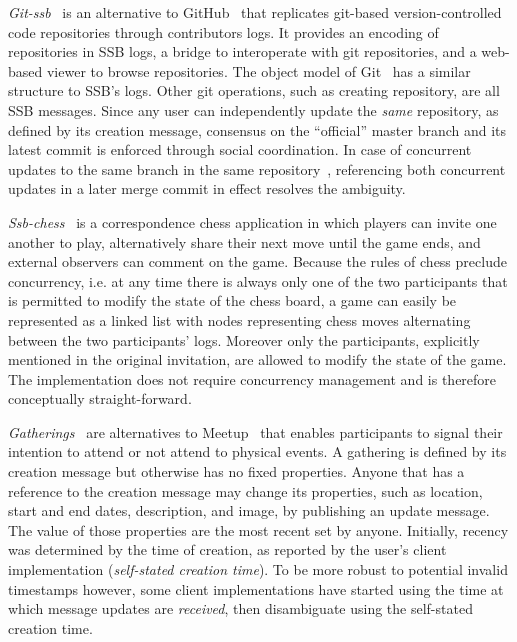\documentclass[9pt,sigconf]{acmart}
\begin{document}
\textit{Git-ssb}~\cite{git-ssb} is an alternative to
GitHub~\cite{github} that replicates git-based version-controlled code
repositories through contributors logs. It provides an encoding of
repositories in SSB logs, a bridge to interoperate with git
repositories, and a web-based viewer to browse repositories. The
object model of Git~\cite{chacon2014pro} has a similar structure to
SSB's logs. Other git operations, such as creating repository, are all
SSB messages. Since any user can independently update the
\textit{same} repository, as defined by its creation message,
consensus on the ``official'' master branch and its latest commit is
enforced through social coordination. In case of concurrent updates to
the same branch in the same repository~\cite{git-ssb-push-conflict},
referencing both concurrent updates in a later merge commit in effect
resolves the ambiguity.

\textit{Ssb-chess}~\cite{ssb-chess} is a correspondence chess
application in which players can invite one another to play,
alternatively share their next move until the game ends, and external
observers can comment on the game.  Because the rules of chess
preclude concurrency, i.e. at any time there is always only one of the
two participants that is permitted to modify the state of the chess
board, a game can easily be represented as a linked list with nodes
representing chess moves alternating between the two participants'
logs.  Moreover only the participants, explicitly mentioned in the
original invitation, are allowed to modify the state of the game. The
implementation does not require concurrency management and is
therefore conceptually straight-forward.

\textit{Gatherings}~\cite{patch-gatherings} are alternatives to
Meetup~\cite{meetup.com} that enables participants to signal their
intention to attend or not attend to physical events. A gathering is
defined by its creation message but otherwise has no fixed
properties. Anyone that has a reference to the creation message may
change its properties, such as location, start and end dates,
description, and image, by publishing an update message. The value of
those properties are the most recent set by anyone. Initially, recency
was determined by the time of creation, as reported by the user's
client implementation (\textit{self-stated creation time}). To be more
robust to potential invalid timestamps however, some client
implementations have started using the time at which message updates
are \textit{received}, then disambiguate using the self-stated
creation time.
\end{document}
